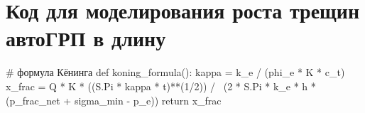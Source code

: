 \chapter{Код для моделирования роста трещин автоГРП в длину}\label{appendix-fractures-growth-modelling}

\begin{pythoncode}
# формула Кёнинга
def koning_formula():
    kappa = k_e / (phi_e * K * c_t)
    x_frac = Q * K * ((S.Pi * kappa * t)**(1/2)) / \
        (2 * S.Pi * k_e * h * (p_frac_net + sigma_min - p_e))
    return x_frac
\end{pythoncode}
